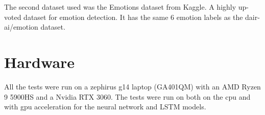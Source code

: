The second dataset used was the Emotions dataset
\cite{nidula_elgiriyewithana_2024} from
Kaggle. A highly up-voted dataset for emotion detection. It has the same 6
emotion labels as the dair-ai/emotion dataset.

\section{Hardware}

All the tests were run on a zephirus g14 laptop (GA401QM) with an AMD Ryzen 9
5900HS and a Nvidia RTX 3060. The tests were run on both on the cpu and with
gpu acceleration for the neural network and LSTM models.
